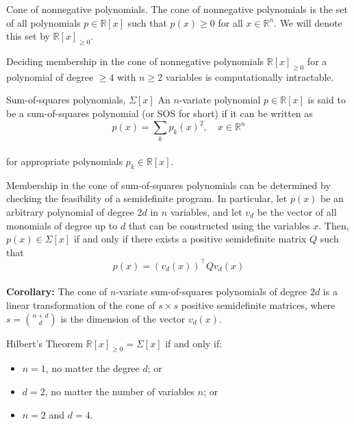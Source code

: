 \begin{definition}[L10.1]{Cone of nonnegative polynomials.}
    The cone of nonnegative polynomials is the set of all polynomials $p \in \mathbb{R}[x]$ such that $p(x) \geq 0$ for all $x \in \mathbb{R}^n$. We will denote this set by $\mathbb{R}[x]_{\geq 0}$.
\end{definition}

\begin{theorem}[L10.1]{}
    Deciding membership in the cone of nonnegative polynomials $\mathbb{R}[x]_{\geq 0}$ for a polynomial of degree $\geq 4$ with $n \geq 2$ variables is computationally intractable.
\end{theorem}

\begin{definition}[L10.2]{Sum-of-squares polynomials, $\Sigma[x]$}
    An $n$-variate polynomial $p \in \mathbb{R}[x]$ is said to be a sum-of-squares polynomial (or SOS for short) if it can be written as
    \vspace{-4pt}\\
    $$
    p(x)=\sum_k p_k(x)^2, \quad x \in \mathbb{R}^n
    $$
    \vspace{-4pt}\\
    for appropriate polynomials $p_k \in \mathbb{R}[x]$.
\end{definition}

\begin{theorem}[L10.2]{}
    Membership in the cone of sum-of-squares polynomials can be determined by checking the feasibility of a semidefinite program. In particular, let $p(x)$ be an arbitrary polynomial of degree $2 d$ in $n$ variables, and let $v_d$ be the vector of all monomials of degree up to $d$ that can be constructed using the variables $x$.
    Then, $p(x) \in \Sigma[x]$ if and only if there exists a positive semidefinite matrix $Q$ such that
    \vspace{-4pt}\\
    $$
    p(x)=\left(v_d(x)\right)^{\top} Q v_d(x)
    $$
    \vspace{-4pt}\\
    \textbf{Corollary:} The cone of $n$-variate sum-of-squares polynomials of degree $2 d$ is a linear transformation of the cone of $s \times s$ positive semidefinite matrices, where $s=\binom{n+d}{d}$ is the dimension of the vector $v_d(x)$.
\end{theorem}

\begin{theorem}[L10.3]{Hilbert's Theorem}
    $\mathbb{R}[x]_{\geq 0}=\Sigma[x]$ if and only if:
    \begin{itemize}[leftmargin=*]
        \item $n=1$, no matter the degree $d$; or
        \item $d=2$, no matter the number of variables $n$; or
        \item $n=2$ and $d=4$.
    \end{itemize}
\end{theorem}

